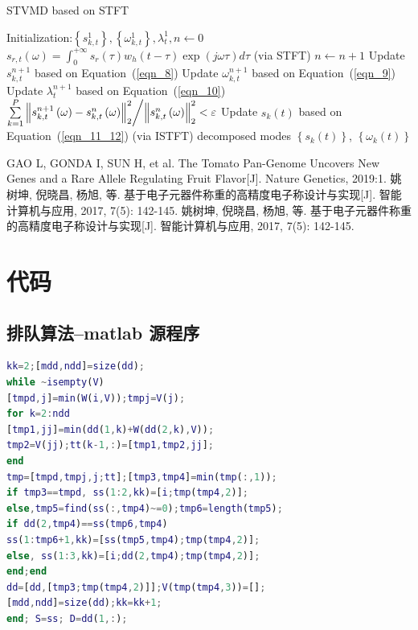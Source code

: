 \documentclass[fontset=windows]{whutmod}
\begin{document}
\begin{algorithm}
	\renewcommand{\algorithmicrequire}{\textbf{Input:}}
	\renewcommand{\algorithmicensure}{\textbf{Output:}}
	\caption{STVMD based on STFT}
	\label{alg1}
	\begin{algorithmic}[1]
		\STATE Initialization:$\left\{ {s_{k,t}^1} \right\},\left\{ {\omega _{k,t}^1} \right\},\lambda _t^1,n \leftarrow 0$
		\STATE  ${s_{r,t}}\left( \omega  \right) = \int_0^{ + \infty } {{s_r}\left( \tau  \right){w_h}\left( {t - \tau } \right)} \exp \left( {j\omega \tau } \right)d\tau $   (via STFT)
		\REPEAT
		\STATE $n \leftarrow n + 1$
		\STATE Update $ s_{k,t}^{n + 1} $ based on Equation~(\ref{eqn_8})
		\STATE Update $\omega _{k,t}^{n + 1}$ based on Equation~(\ref{eqn_9})
		\STATE Update $\lambda _t^{n + 1} $ based on Equation~(\ref{eqn_10})
		\UNTIL $\sum\limits_{k=1}^P  {{{\left\| {s_{k,t}^{n + 1}\left( \omega  \right) - s_{k,t}^n\left( \omega  \right)} \right\|_2^2} \mathord{\left/
					{\vphantom {{\left\| {s_{k,t}^{n + 1}\left( \omega  \right) - s_{k,t}^n\left( \omega  \right)} \right\|_2^2} {\left\| {s_{k,t}^n\left( \omega  \right)} \right\|_2^2}}} \right.
					\kern-\nulldelimiterspace} {\left\| {s_{k,t}^n\left( \omega  \right)} \right\|_2^2}}}  < \varepsilon $  
		\STATE   Update ${s_k}\left( t \right)$ based on Equation~(\ref{eqn_11_12})  (via ISTFT)
		\ENSURE  decomposed modes $ \left\{ {{s_k}\left( t \right)} \right\}$, $\left\{ {{\omega _k}\left( t \right)} \right\}$
	\end{algorithmic}  
\end{algorithm}



\newpage
\begin{thebibliography}{9}%
	 GAO L, GONDA I, SUN H, et al. The Tomato Pan-Genome Uncovers New Genes and a	Rare Allele Regulating Fruit Flavor[J]. Nature Genetics, 2019:1.
	 姚树坤, 倪晓昌, 杨旭, 等. 基于电子元器件称重的高精度电子称设计与实现[J]. 智能计算机与应用, 2017, 7(5): 142-145.
	 姚树坤, 倪晓昌, 杨旭, 等. 基于电子元器件称重的高精度电子称设计与实现[J]. 智能计算机与应用, 2017, 7(5): 142-145.
\end{thebibliography}
\newpage
\appendix %

\section{代码}
\subsection{排队算法--matlab 源程序}
\begin{lstlisting}[language=matlab]
kk=2;[mdd,ndd]=size(dd);
while ~isempty(V)
[tmpd,j]=min(W(i,V));tmpj=V(j);
for k=2:ndd
[tmp1,jj]=min(dd(1,k)+W(dd(2,k),V));
tmp2=V(jj);tt(k-1,:)=[tmp1,tmp2,jj];
end
tmp=[tmpd,tmpj,j;tt];[tmp3,tmp4]=min(tmp(:,1));
if tmp3==tmpd, ss(1:2,kk)=[i;tmp(tmp4,2)];
else,tmp5=find(ss(:,tmp4)~=0);tmp6=length(tmp5);
if dd(2,tmp4)==ss(tmp6,tmp4)
ss(1:tmp6+1,kk)=[ss(tmp5,tmp4);tmp(tmp4,2)];
else, ss(1:3,kk)=[i;dd(2,tmp4);tmp(tmp4,2)];
end;end
dd=[dd,[tmp3;tmp(tmp4,2)]];V(tmp(tmp4,3))=[];
[mdd,ndd]=size(dd);kk=kk+1;
end; S=ss; D=dd(1,:);
\end{lstlisting}
\end{document}
